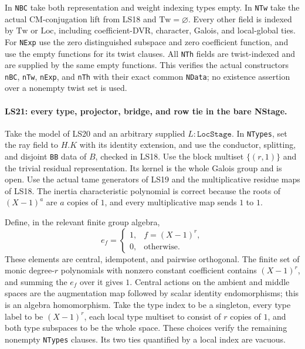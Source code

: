 In \texttt{NBC} take both representation and weight indexing
types empty. In \texttt{NTw} take the actual CM-conjugation
lift from LS18 and $\mathrm{Tw}=\varnothing$. Every other
field is indexed by $\mathrm{Tw}$ or $\mathrm{Loc}$, including
coefficient-DVR, character, Galois, and local-global ties.
For \texttt{NExp} use the zero distinguished subspace and zero
coefficient function, and use the empty functions for its twist
clauses. All \texttt{NTh} fields are twist-indexed and are
supplied by the same empty functions. This verifies the actual
constructors \texttt{nBC}, \texttt{nTw}, \texttt{nExp}, and
\texttt{nTh} with their exact common \texttt{NData}; no
existence assertion over a nonempty twist set is used.

\paragraph{LS21: every type, projector, bridge, and row tie in the bare NStage.}
Take the model of LS20 and an arbitrary supplied
$L:\texttt{LocStage}$. In \texttt{NTypes}, set the ray field
to $H.K$ with its identity extension, and use the conductor,
splitting, and disjoint \texttt{BB} data of $B$, checked in LS18.
Use the block multiset $\{(r,1)\}$ and the trivial residual
representation. Its kernel is the whole Galois group and is open.
Use the actual tame generators of LS19 and the multiplicative
residue maps of LS18. The inertia characteristic polynomial is
correct because the roots of $(X-1)^a$ are $a$ copies of $1$,
and every multiplicative map sends $1$ to $1$.

Define, in the relevant finite group algebra,
\[
 e_f=\begin{cases}1,&f=(X-1)^r,\\0,&\text{otherwise}.
       \end{cases}                                      \tag{LS.46}
\]
These elements are central, idempotent, and pairwise orthogonal.
The finite set of monic degree-$r$ polynomials with nonzero
constant coefficient contains $(X-1)^r$, and summing the $e_f$
over it gives $1$. Central actions on the ambient and middle
spaces are the augmentation map followed by scalar identity
endomorphisms; this is an algebra homomorphism. Take the type
index to be a singleton, every type label to be $(X-1)^r$,
each local type multiset to consist of $r$ copies of $1$, and
both type subspaces to be the whole space. These choices verify
the remaining nonempty \texttt{NTypes} clauses. Its two ties
quantified by a local index are vacuous.


